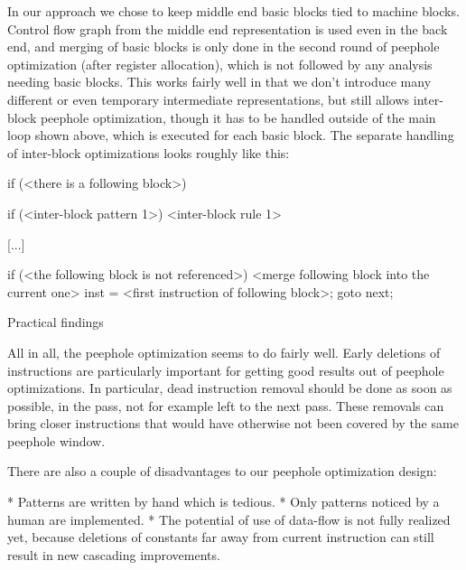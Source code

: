 In our approach we chose to keep middle end basic blocks tied to machine blocks.
Control flow graph from the middle end representation is used even in the back
end, and merging of basic blocks is only done in the second round of peephole
optimization (after register allocation), which is not followed by any analysis
needing basic blocks. This works fairly well in that we don't introduce many
different or even temporary intermediate representations, but still allows
inter-block peephole optimization, though it has to be handled outside of the
main loop shown above, which is executed for each basic block. The separate
handling of inter-block optimizations looks roughly like this:

\begtt \optparams
if (<there is a following block>) {
	if (<inter-block pattern 1>) {
		<inter-block rule 1>
	}

	[...]

	if (<the following block is not referenced>) {
		<merge following block into the current one>
		inst = <first instruction of following block>;
		goto next;
	}
}
\endtt

%

\secc Practical findings

All in all, the peephole optimization seems to do fairly well. Early deletions of
instructions are particularly important for getting good results out of peephole
optimizations. In particular, dead instruction removal should be done as soon as
possible, in the pass, not for example left to the next pass. These
removals can bring closer instructions that would have otherwise not been
covered by the same peephole window.

There are also a couple of disadvantages to our peephole optimization design:

\begitems

* Patterns are written by hand which is tedious.
* Only patterns noticed by a human are implemented.
* The potential of use of data-flow is not fully realized yet, because deletions
of constants far away from current instruction can still result in new
cascading improvements.

